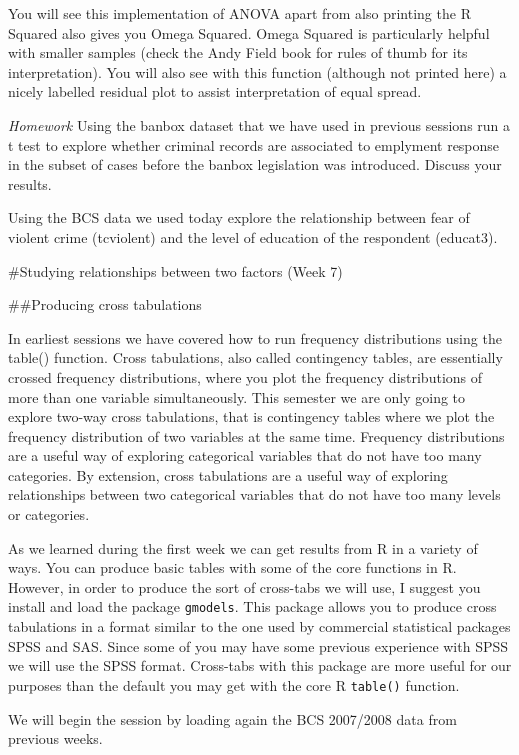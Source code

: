 \documentclass[]{book}
\theoremstyle{definition}
\theoremstyle{definition}
\theoremstyle{definition}
\theoremstyle{remark}
\begin{document}
You will see this implementation of ANOVA apart from also printing the R
Squared also gives you Omega Squared. Omega Squared is particularly
helpful with smaller samples (check the Andy Field book for rules of
thumb for its interpretation). You will also see with this function
(although not printed here) a nicely labelled residual plot to assist
interpretation of equal spread.

\emph{Homework} Using the banbox dataset that we have used in previous
sessions run a t test to explore whether criminal records are associated
to emplyment response in the subset of cases before the banbox
legislation was introduced. Discuss your results.

Using the BCS data we used today explore the relationship between fear
of violent crime (tcviolent) and the level of education of the
respondent (educat3).

\#Studying relationships between two factors (Week 7)

\#\#Producing cross tabulations

In earliest sessions we have covered how to run frequency distributions
using the table() function. Cross tabulations, also called contingency
tables, are essentially crossed frequency distributions, where you plot
the frequency distributions of more than one variable simultaneously.
This semester we are only going to explore two-way cross tabulations,
that is contingency tables where we plot the frequency distribution of
two variables at the same time. Frequency distributions are a useful way
of exploring categorical variables that do not have too many categories.
By extension, cross tabulations are a useful way of exploring
relationships between two categorical variables that do not have too
many levels or categories.

As we learned during the first week we can get results from R in a
variety of ways. You can produce basic tables with some of the core
functions in R. However, in order to produce the sort of cross-tabs we
will use, I suggest you install and load the package \texttt{gmodels}.
This package allows you to produce cross tabulations in a format similar
to the one used by commercial statistical packages SPSS and SAS. Since
some of you may have some previous experience with SPSS we will use the
SPSS format. Cross-tabs with this package are more useful for our
purposes than the default you may get with the core R \texttt{table()}
function.

We will begin the session by loading again the BCS 2007/2008 data from
previous weeks.
\end{document}

